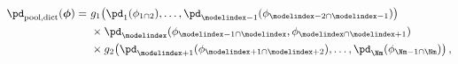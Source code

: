 \begin{equation}
  \begin{aligned}
    \pd_{\text{pool,dict}}(\boldsymbol{\phi}) = \,\,
      & g_{1} \! \left(\pd_{1}(\phi_{1 \cap 2}), \ldots, \pd_{\modelindex - 1}(\phi_{\modelindex - 2 \cap \modelindex - 1})\right)  \\
      \,\, & \times \pd_{\modelindex}(\phi_{\modelindex - 1 \cap \modelindex}, \phi_{\modelindex \cap \modelindex + 1}) \\
      \,\, & \times g_{2}\!\left(\pd_{\modelindex + 1}(\phi_{\modelindex + 1 \cap \modelindex + 2}), \ldots, \pd_{\Nm}(\phi_{\Nm - 1 \cap \Nm})\right),
  \end{aligned}
  \label{eqn:dictatorial-one-submodel}
\end{equation}